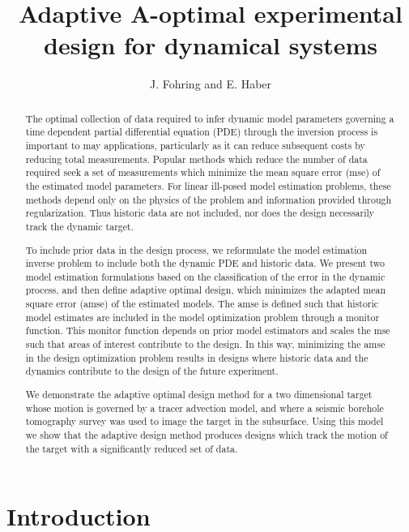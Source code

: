\documentclass[11pt]{article}
\begin{document}
\title{ Adaptive A-optimal experimental design for dynamical systems}
\author{J. Fohring and E. Haber }
\maketitle


\begin{abstract}
The optimal collection of data required to infer dynamic model parameters governing a time dependent partial differential equation (PDE) through the inversion process is important to may applications, particularly as it can reduce subsequent costs by reducing total measurements. 
 Popular methods which reduce the number of data required seek a set of measurements which minimize the mean square error (mse)  of the estimated model parameters. For linear ill-posed model estimation problems, these methods depend only on the physics of the problem and information provided through regularization. Thus historic data are not included, nor does the design necessarily track the dynamic target.

 To include prior data in the design process, we reformulate the model estimation inverse problem to include both the dynamic PDE and historic data. We present two model estimation formulations based on the classification of the error in the dynamic process, and then define  adaptive optimal design, which minimizes the adapted  mean square error (amse) of the estimated models. The amse is defined such that historic model estimates are included in the model optimization problem through a monitor function. This monitor function depends on prior model estimators and scales the mse such that areas of interest  contribute  to the design. In this way, minimizing the amse in the design optimization problem results in designs where historic  data and the dynamics contribute to the design of the future experiment.

We demonstrate the adaptive optimal design method for a two dimensional target whose motion is governed by a tracer advection model, and where a seismic borehole tomography survey was used to image the target in the subsurface. Using this model we show that the adaptive design method produces designs which track the motion of the target with a  significantly reduced set of data. 
 


\end{abstract}


\section{Introduction}
\end{document}
